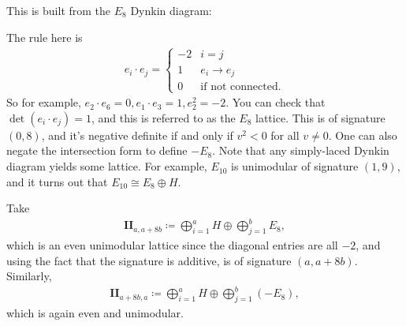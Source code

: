 \begin{example}

This is built from the \(E_8\) Dynkin diagram:

\begin{center}
\end{center}

The rule here is
\begin{align*}
e_i \cdot e_j = 
\begin{cases}
-2  & i =  j
\\
1 & e_i \to e_j \\
0 & \text{if not connected}.
\end{cases}
\end{align*}
So for example, \(e_2 \cdot e_6 = 0, e_1 \cdot e_3 = 1, e_2^2 = -2\).
You can check that \(\det(e_i \cdot e_j) = 1\), and this is referred to
as the \(E_8\) lattice. This is of signature \((0, 8)\), and it's
negative definite if and only if \(v^2 < 0\) for all \(v\neq 0\). One
can also negate the intersection form to define \(-E_8\). Note that any
simply-laced Dynkin diagram yields some lattice. For example, \(E_{10}\)
is unimodular of signature \((1, 9)\), and it turns out that
\(E_{10} \cong E_8 \oplus H\).

\end{example}

\begin{definition}[?]

Take
\begin{align*} 
\mathbf{II}_{a, a+8b} \coloneqq\bigoplus_{i=1}^a H \oplus \bigoplus_{j=1}^b E_8 
,\end{align*}
which is an even unimodular lattice since the diagonal entries are all
\(-2\), and using the fact that the signature is additive, is of
signature \((a, a+8b)\). Similarly,
\begin{align*} 
\mathbf{II}_{a+8b, a} \coloneqq\bigoplus_{i=1}^a H \oplus \bigoplus_{j=1}^b (-E_8) 
,\end{align*}
which is again even and unimodular.

\end{definition}

